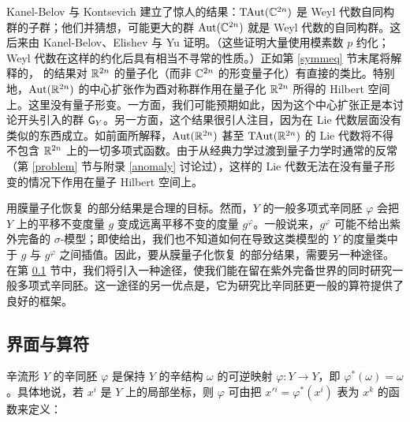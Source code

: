 Kanel-Belov 与 Kontsevich \cite{BKK} 建立了惊人的结果：${\mathrm{TAut}}({\mathbb C}^{2n})$ 是 Weyl 代数自同构群的子群；他们并猜想，可能更大的群 ${\mathrm{Aut}}({\mathbb C}^{2n})$ 就是 Weyl 代数的自同构群。这后来由 Kanel-Belov、Elishev 与 Yu \cite{BEY} 证明。（这些证明大量使用模素数 $p$ 约化；Weyl 代数在这样的约化后具有相当不寻常的性质。）正如第 \ref{symmeq} 节末尾将解释的，\cite{BKK,BEY} 的结果对 ${\mathbb R}^{2n}$ 的量子化（而非 ${\mathbb C}^{2n}$ 的形变量子化）有直接的类比。特别地，${\mathrm{Aut}}({\mathbb R}^{2n})$ 的中心扩张作为酉对称群作用在量子化 ${\mathbb R}^{2n}$ 所得的 Hilbert 空间上。这里没有量子形变。一方面，我们可能预期如此，因为这个中心扩张正是本讨论开头引入的群 ${\text{\sf G}}_Y$。另一方面，这个结果很引人注目，因为在 Lie 代数层面没有类似的东西成立。如前面所解释，${\mathrm{Aut}}({\mathbb R}^{2n})$ 甚至 ${\mathrm{TAut}}({\mathbb R}^{2n})$ 的 Lie 代数将不得不包含 ${\mathbb R}^{2n}$ 上的一切多项式函数。由于从经典力学过渡到量子力学时通常的反常（第 \ref{problem} 节与附录 \ref{anomaly} 讨论过），这样的 Lie 代数无法在没有量子形变的情况下作用在量子 Hilbert 空间上。

用膜量子化恢复 \cite{BKK,BEY} 的部分结果是合理的目标。然而，$Y$ 的一般多项式辛同胚 $\varphi$ 会把 $Y$ 上的平移不变度量 $g$ 变成远离平移不变的度量 $g^\varphi$。一般说来，$g^\varphi$ 可能不给出紫外完备的 $\sigma$-模型；即使给出，我们也不知道如何在导致这类模型的 $Y$ 的度量类中于 $g$ 与 $g^\varphi$ 之间插值。因此，要从膜量子化恢复 \cite{BKK,BEY} 的部分结果，需要另一种途径。在第 \ref{corresp} 节中，我们将引入一种途径，使我们能在留在紫外完备世界的同时研究一般多项式辛同胚。这一途径的另一优点是，它为研究比辛同胚更一般的算符提供了良好的框架。

\subsection{界面与算符}\label{corresp}

辛流形 $Y$ 的辛同胚 $\varphi$ 是保持 $Y$ 的辛结构 $\omega$ 的可逆映射 $\varphi:Y\to Y$，即 $\varphi^*(\omega)=\omega$。具体地说，若 $x^i$ 是 $Y$ 上的局部坐标，则 $\varphi$ 可由把 $x'{}^{i}=\varphi^*(x^i)$ 表为 $x^k$ 的函数来定义：
